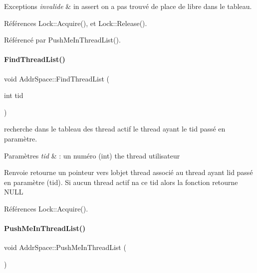 \begin{DoxyExceptions}{Exceptions}
{\em invalide} & in assert on a pas trouvé de place de libre dans le tableau. \\
\hline
\end{DoxyExceptions}


Références Lock\+::\+Acquire(), et Lock\+::\+Release().



Référencé par Push\+Me\+In\+Thread\+List().

\hypertarget{class_addr_space_aaaefe0a86296c40a15f6f238bf96f30e}{}\label{class_addr_space_aaaefe0a86296c40a15f6f238bf96f30e} 
\paragraph{\texorpdfstring{Find\+Thread\+List()}{FindThreadList()}}
{\footnotesize\ttfamily void Addr\+Space\+::\+Find\+Thread\+List (\begin{DoxyParamCaption}\item[{int}]{tid }\end{DoxyParamCaption})}



recherche dans le tableau des thread actif le thread ayant le tid passé en paramètre. 


\begin{DoxyParams}{Paramètres}
{\em tid} & \+: un numéro (int) the thread utilisateur \\
\hline
\end{DoxyParams}
\begin{DoxyReturn}{Renvoie}
retourne un pointeur vers l\textquotesingle{}objet thread associé au thread ayant l\textquotesingle{}id passé en paramètre (tid). Si aucun thread actif n\textquotesingle{}a ce tid alors la fonction retourne N\+U\+LL 
\end{DoxyReturn}


Références Lock\+::\+Acquire().

\hypertarget{class_addr_space_a0357219ec2eaccdd49b7635bf06f8172}{}\label{class_addr_space_a0357219ec2eaccdd49b7635bf06f8172} 
\paragraph{\texorpdfstring{Push\+Me\+In\+Thread\+List()}{PushMeInThreadList()}}
{\footnotesize\ttfamily void Addr\+Space\+::\+Push\+Me\+In\+Thread\+List (\begin{DoxyParamCaption}{ }\end{DoxyParamCaption})}



